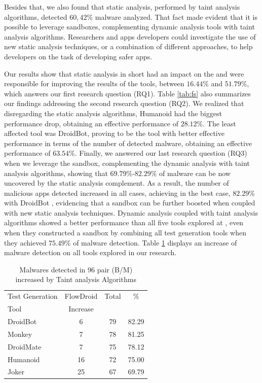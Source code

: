 Besides that, we also found that static analysis, performed by taint analysis algorithms, detected $60,42\%$ malware analyzed.  That fact made evident that it is possible to leverage sandboxes, complementing dynamic analysis tools with taint analysis algorithms. Researchers and apps developers could investigate the use of new static analysis techniques, or a combination of different approaches, to help developers on the task of developing safer apps.

Our results show that static analysis in short had an impact on the \blls and were responsible for improving the results of the tools, between $16.44\%$ and $51.79\%$, which answers our first research question (RQ1). Table \ref{tab:fs} also summarizes our findings addressing the second research question (RQ2). We realized that disregarding the static analysis algorithms, Humanoid had the biggest performance drop, obtaining an effective performance of $28.12\%$. The least affected tool was DroidBot, proving to be the tool with better effective performance in terms of the number of detected malware, obtaining an effective performance of $63.54\%$. Finally, we answered our last research question (RQ3) when we leverage the sandbox, complementing the dynamic analysis with taint analysis algorithms, showing that $69.79\%$-$82.29\%$ of malware can be now uncovered by the static analysis  complement. As a result, the number of malicious apps detected increased in all cases, achieving in the best case, $82.29\%$ with DroidBot , evidencing that a sandbox can be further boosted when coupled with new static analysis techniques. Dynamic analysis coupled with taint analysis algorithms showed a better performance than all five tools explored at \blls, even when they constructed a sandbox by combining all test generation tools when they achieved $75.49\%$ of malware detection. Table \ref{tab:tanted} displays an increase of malware detection on all tools explored in our research.


\begin{table}[ht]
\centering
\begin{tabular}{lccc}\toprule
 Test Generation & FlowDroid & Total & \%\\
 Tool & Increase  &  & \\ \midrule
 DroidBot & 6 & 79 & 82.29\\
 Monkey & 7 &  78 & 81.25 \\
 DroidMate & 7 & 75 & 78.12  \\
 Humanoid & 16 & 72 & 75.00 \\
 Joker & 25 & 67 & 69.79  \\\midrule
 
\end{tabular} 
\caption{Malwares detected in 96 pair (B/M) increased by Taint analysis Algorithms}
\label{tab:tanted}
\end{table}




